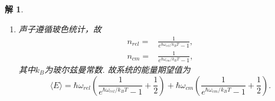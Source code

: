 \documentclass[UTF8,10pt,a4paper]{article}
\theoremstyle{Problem}
\theoremstyle{Solution}
\newtheorem*{sol}{解}
\begin{document}
\begin{sol}
\begin{enumerate}
\begin{align}
            =&\frac{p_{rel}^2}{m}+\frac{p_{cm}^2}{4m}+\frac{1}{2}\left(\frac{k}{2}+K\right)x_{rel}^2+kx_{cm}^2.
        \end{align}
        该哈密顿已被退耦合为两个简谐振子的哈密顿：
        \begin{align}
            H_{rel}=&\frac{p_{rel}^2}{2\left(\frac{1}{2}m\right)}+\frac{1}{2}\left(\frac{k}{2}+K\right)x_{rel}^2,\\
            H_{cm}=&\frac{p_{cm}^2}{2(2m)}+\frac{1}{2}(2k)x_{cm}^2.
        \end{align}
        这两个简谐振子的本征频率分别为
        \begin{align}
            \omega_{rel}=\sqrt{\frac{k+2K}{m}},\\
            \omega_{cm}=\sqrt{\frac{k}{m}}.
        \end{align}
        故该系统的能谱为
        \begin{equation}
            E_{n_{rel},n_{cm}}=\hbar\omega_{rel}(n_{rel}+\frac{1}{2})+\hbar\omega_{cm}(n_{cm}+\frac{1}{2}).
        \end{equation}
        \item[(d)] 声子遵循玻色统计，故
        \begin{align}
            n_{rel}=&\frac{1}{e^{\hbar\omega_{rel}/k_BT}-1},\\
            n_{cm}=&\frac{1}{e^{\hbar\omega_{cm}/k_BT}-1},
        \end{align}
        其中$k_B$为玻尔兹曼常数.
        故系统的能量期望值为
        \begin{equation}
            \langle E\rangle=\hbar\omega_{rel}\left(\frac{1}{e^{\hbar\omega_{rel}/k_BT}-1}+\frac{1}{2}\right)+\hbar\omega_{cm}\left(\frac{1}{e^{\hbar\omega_{cm}/k_BT}-1}+\frac{1}{2}\right).
        \end{equation}
    \end{enumerate}
\end{sol}
\end{document}
